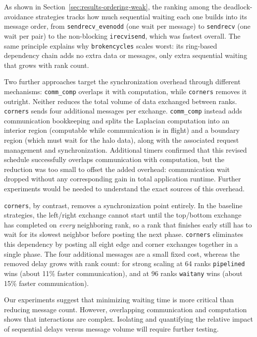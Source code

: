 \documentclass{article}
\begin{document}
As shown in Section~\ref{sec:results-ordering-weak}, the ranking among
the deadlock-avoidance strategies tracks how much sequential waiting
each one builds into its message order, from \texttt{sendrecv\_evenodd} (one wait per message) to \texttt{sendrecv} (one wait per pair) to the non-blocking \texttt{irecvisend}, which was fastest overall. The same principle explains why \texttt{brokencycles} scales worst: its ring-based dependency chain adds no extra data or messages, only extra
sequential waiting that grows with rank count.

Two further approaches target the synchronization overhead through different mechanisms: \texttt{comm\_comp} overlaps it with computation, while \texttt{corners} removes it outright. Neither reduces the total volume of data exchanged between ranks. \texttt{corners} sends four additional messages per exchange. \texttt{comm\_comp} instead adds communication bookkeeping and splits the Laplacian computation into an interior region (computable while communication is in flight) and a boundary region (which must wait for the halo data), along with the associated request management and synchronization. Additional timers confirmed that this revised schedule successfully overlaps communication with computation, but the reduction was too small to offset the added overhead: communication wait dropped without any corresponding gain in total application runtime. Further experiments would be needed to understand the exact sources of this overhead.

\texttt{corners}, by contrast, removes a synchronization point entirely. In the baseline strategies, the left/right exchange cannot start until the top/bottom exchange has completed on \emph{every} neighboring rank, so a rank that finishes early still has to wait for its slowest neighbor before posting the next phase. \texttt{corners} eliminates this dependency by posting all eight edge and corner exchanges together in a single phase. The four additional messages are a small fixed cost, whereas the removed delay grows with rank count: for strong scaling at 64 ranks \texttt{pipelined} wins (about 11\% faster communication), and at 96 ranks \texttt{waitany} wins (about 15\% faster communication).

Our experiments suggest that minimizing waiting time is more critical than reducing message count. However, overlapping communication and computation shows that interactions are complex. Isolating and quantifying the relative impact of sequential delays versus message volume will require further testing.
\end{document}
